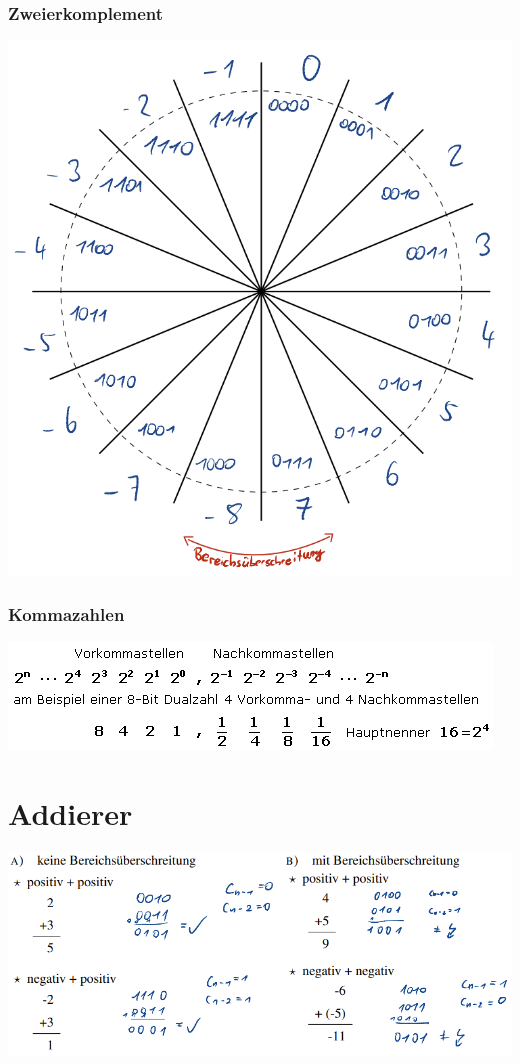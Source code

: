 \documentclass[12pt,a4paper]{article}
\begin{document}
	\begin{minipage}[t]{0.5\textwidth}
		\subsubsection{Zweierkomplement}
			\includegraphics[width=\textwidth]{Bilder/zweierkomplement.PNG}
	\end{minipage}

	\subsubsection{Kommazahlen}
		\includegraphics[width=\textwidth]{Bilder/gleitkommazahlen.png}
		
\section{Addierer}
	\includegraphics[width=\textwidth]{Bilder/addition.PNG}
\end{document}

